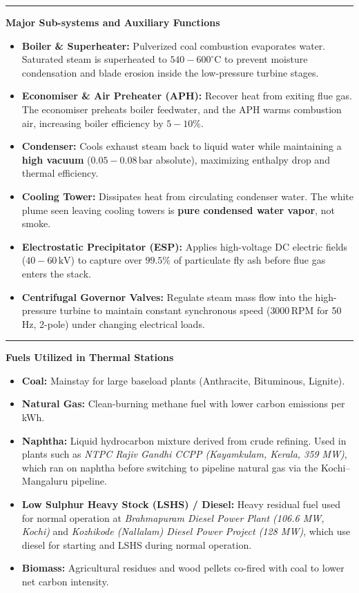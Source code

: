 \documentclass[11pt,a4paper]{article}
\newcommand{\concept}[1]{%
  \vspace{3pt}\noindent\textcolor{AnthGreen}{\rule{3.5pt}{10pt}}\enspace
  \textbf{\sffamily\color{AnthDark}#1}\par\vspace{2pt}%
}
\begin{document}
\concept{Major Sub-systems and Auxiliary Functions}
\begin{itemize}
  \item \textbf{Boiler \& Superheater:} Pulverized coal combustion evaporates water. Saturated steam is superheated to $540-600^\circ\text{C}$ to prevent moisture condensation and blade erosion inside the low-pressure turbine stages.
  \item \textbf{Economiser \& Air Preheater (APH):} Recover heat from exiting flue gas. The economiser preheats boiler feedwater, and the APH warms combustion air, increasing boiler efficiency by $5-10\%$.
  \item \textbf{Condenser:} Cools exhaust steam back to liquid water while maintaining a \textbf{high vacuum} ($0.05-0.08\,\text{bar}$ absolute), maximizing enthalpy drop and thermal efficiency.
  \item \textbf{Cooling Tower:} Dissipates heat from circulating condenser water. The white plume seen leaving cooling towers is \textbf{pure condensed water vapor}, not smoke.
  \item \textbf{Electrostatic Precipitator (ESP):} Applies high-voltage DC electric fields ($40-60\,\text{kV}$) to capture over $99.5\%$ of particulate fly ash before flue gas enters the stack.
  \item \textbf{Centrifugal Governor Valves:} Regulate steam mass flow into the high-pressure turbine to maintain constant synchronous speed ($3000\,\text{RPM}$ for 50 Hz, 2-pole) under changing electrical loads.
\end{itemize}

\concept{Fuels Utilized in Thermal Stations}
\begin{itemize}
  \item \textbf{Coal:} Mainstay for large baseload plants (Anthracite, Bituminous, Lignite).
  \item \textbf{Natural Gas:} Clean-burning methane fuel with lower carbon emissions per kWh.
  \item \textbf{Naphtha:} Liquid hydrocarbon mixture derived from crude refining. Used in plants such as \emph{NTPC Rajiv Gandhi CCPP (Kayamkulam, Kerala, 359 MW)}, which ran on naphtha before switching to pipeline natural gas via the Kochi--Mangaluru pipeline.
  \item \textbf{Low Sulphur Heavy Stock (LSHS) / Diesel:} Heavy residual fuel used for normal operation at \emph{Brahmapuram Diesel Power Plant (106.6 MW, Kochi)} and \emph{Kozhikode (Nallalam) Diesel Power Project (128 MW)}, which use diesel for starting and LSHS during normal operation.
  \item \textbf{Biomass:} Agricultural residues and wood pellets co-fired with coal to lower net carbon intensity.
\end{itemize}
\end{document}
